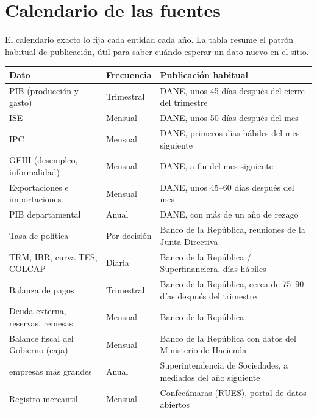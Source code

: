 \chapter{Calendario de las fuentes}
\label{es:r:calendario}

El calendario exacto lo fija cada entidad cada año. La tabla resume el patrón habitual de publicación, útil para saber
cuándo esperar un dato nuevo en el sitio.

\begin{center}
\small
\begin{tabularx}{\linewidth}{>{\raggedright\arraybackslash}p{4.2cm}>{\raggedright\arraybackslash}p{2.4cm}X}
\toprule
\textbf{Dato} & \textbf{Frecuencia} & \textbf{Publicación habitual}\\
\midrule
PIB (producción y gasto) & Trimestral & DANE, unos 45 días después del cierre del trimestre\\
ISE & Mensual & DANE, unos 50 días después del mes\\
IPC & Mensual & DANE, primeros días hábiles del mes siguiente\\
GEIH (desempleo, informalidad) & Mensual & DANE, a fin del mes siguiente\\
Exportaciones e importaciones & Mensual & DANE, unos 45–60 días después del mes\\
PIB departamental & Anual & DANE, con más de un año de rezago\\
Tasa de política & Por decisión & Banco de la República, reuniones de la Junta Directiva\\
TRM, IBR, curva TES, COLCAP & Diaria & Banco de la República / Superfinanciera, días hábiles\\
Balanza de pagos & Trimestral & Banco de la República, cerca de 75–90 días después del trimestre\\
Deuda externa, reservas, remesas & Mensual & Banco de la República\\
Balance fiscal del Gobierno (caja) & Mensual & Banco de la República con datos del Ministerio de Hacienda\\
10.000 empresas más grandes & Anual & Superintendencia de Sociedades, a mediados del año siguiente\\
Registro mercantil & Mensual & Confecámaras (RUES), portal de datos abiertos\\
\bottomrule
\end{tabularx}
\end{center}

